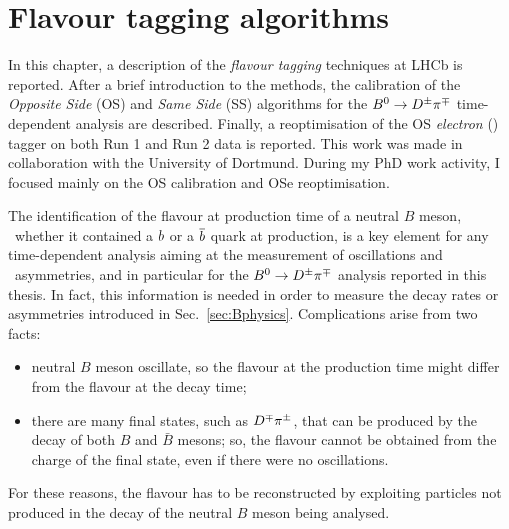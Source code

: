 \section{Flavour tagging algorithms}
\label{sec:tagging}

In this chapter, a description of the \emph{flavour tagging} techniques at LHCb is reported.
After a brief introduction to the methods,
the calibration of the \emph{Opposite Side} (OS) and \emph{Same Side} (SS) algorithms for the $B^0\rightarrow D^\pm\pi^\mp$ 
time-dependent analysis are 
described. Finally, a reoptimisation of the OS \emph{electron} (\OSe) tagger on both Run 1 and Run 2 data is reported. 
This work was made in collaboration with the University of Dortmund. During my PhD work
activity, I focused mainly on the OS calibration and OSe reoptimisation.

The identification of the flavour at production time of a neutral $B$ meson, \ie~whether it contained a $b$ or a $\overline {b}$ quark at
production, is a key element 
for any time-dependent analysis aiming at the measurement of oscillations and \CP~asymmetries, and in particular for the $B^0\rightarrow
D^\pm\pi^\mp$ analysis reported in this thesis. In fact, this information is needed in order to measure the decay rates or asymmetries introduced in Sec.~\ref{sec:Bphysics}.
Complications arise from two facts:
\begin{itemize}[noitemsep,topsep=0pt]
	\item neutral $B$ meson oscillate, so the flavour at the production time might differ from the flavour at the decay time;
	\item there are many final states, such as $D^\mp\pi^\pm$, that can be produced by the decay of both $B$ and $\bar B$ mesons; so, the flavour cannot be obtained from the charge of the final state, even if there were no oscillations.
\end{itemize}
For these reasons, the flavour has to be reconstructed by exploiting particles not produced in the decay of the neutral $B$ meson being analysed.

